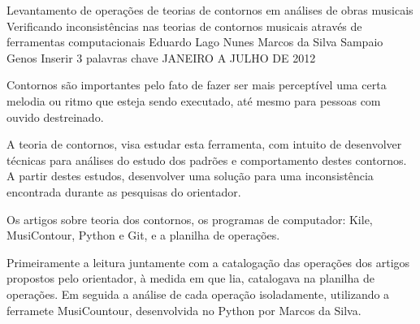 \documentclass[11pt]{article}
\begin{document}
\graphicspath{{figs/}}


\dadosRelatorioFinal
{Levantamento de operações de teorias de contornos em análises de
  obras musicais}
{Verificando inconsistências nas teorias de contornos musicais através
  de ferramentas computacionais }
{Eduardo Lago Nunes}
{Marcos da Silva Sampaio}
{Genos}
{Inserir 3 palavras chave}
{JANEIRO A JULHO DE 2012}


\newpage

\setcounter{page}{1}
\onehalfspace

\label{sec:introducao}


Contornos são importantes pelo fato de fazer ser mais perceptível uma
certa melodia ou ritmo que esteja sendo executado, até mesmo para
pessoas com ouvido destreinado.

A teoria de contornos, visa estudar esta ferramenta, com intuito de
desenvolver técnicas para análises do estudo dos padrões e
comportamento destes contornos.  A partir destes estudos, desenvolver
uma solução para uma inconsistência encontrada durante as pesquisas do
orientador.


\label{sec:materiais}


Os artigos sobre teoria dos contornos, os programas de computador:
Kile, MusiContour, Python e Git, e a planilha de
operações.

Primeiramente a leitura juntamente com a catalogação das operações dos
artigos propostos pelo orientador, à medida em que lia, catalogava na
planilha de operações.  Em seguida a análise de cada operação
isoladamente, utilizando a ferramete MusiCountour, desenvolvida no
Python por Marcos da Silva.
\end{document}
